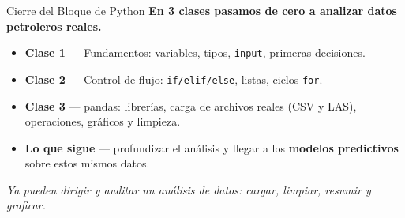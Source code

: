 \documentclass[aspectratio=169, 11pt]{beamer}
\begin{document}
\begin{frame}{Cierre del Bloque de Python}
  \vspace{-6pt}
  {\small\color{arcaDark}\bfseries
    En 3 clases pasamos de cero a analizar datos petroleros reales.}

  \vspace{10pt}
  {\footnotesize
  \begin{itemize}\setlength{\itemsep}{8pt}
    \item[{\color{arcaRed}\Large\faArrowCircleRight}]
      \textbf{Clase 1} --- Fundamentos: variables, tipos, \texttt{input}, primeras decisiones.

    \item[{\color{arcaRed}\Large\faArrowCircleRight}]
      \textbf{Clase 2} --- Control de flujo: \texttt{if/elif/else}, listas, ciclos \texttt{for}.

    \item[{\color{arcaRed}\Large\faArrowCircleRight}]
      \textbf{Clase 3} --- pandas: librerías, carga de archivos reales (CSV y LAS),
      operaciones, gráficos y limpieza.

    \item[{\color{arcaRed}\Large\faArrowCircleRight}]
      \textbf{Lo que sigue} --- profundizar el análisis y llegar a los
      \textbf{modelos predictivos} sobre estos mismos datos.
  \end{itemize}
  }

  \vspace{8pt}
  \centering
  {\footnotesize\color{textMuted}\itshape
    Ya pueden dirigir y auditar un análisis de datos: cargar, limpiar, resumir y graficar.}
\end{frame}
\end{document}
